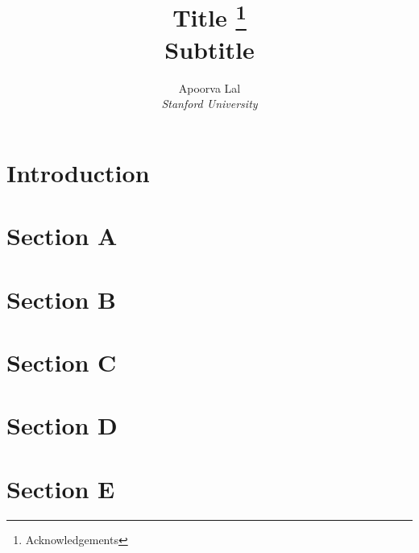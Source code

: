 \documentclass[a4paper, 12pt]{article}
\title{Title \thanks{Acknowledgements} \\
  \large Subtitle}
\author{
  Apoorva Lal \\
  \emph{Stanford University}
}
\begin{document}
\begin{titlingpage}
    \maketitle
    \begin{abstract}
        \lipsum[4]
    \end{abstract}
\end{titlingpage}


\section*{Introduction}


\cite{Deatonanalysishouseholdsurveys1997}

\parencite{Acemoglucolonialoriginscomparative2001}


\section{Section A}
\lipsum[2]

\section{Section B}
\lipsum[3]

\section{Section C}
\lipsum[3]

\section{Section D}
\lipsum[4]

\section{Section E}
\lipsum[7]

\renewcommand{\mkbibnamefamily}[1]{\textsc{#1}} %
\printbibliography
\end{document}
